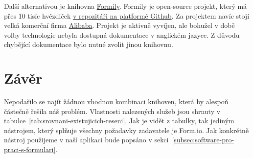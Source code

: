 Další alternativou je knihovna \href{https://formilyjs.org/}{Formily}.
Formily je open-source projekt, který má přes 10 tisíc hvězdiček \href{https://github.com/alibaba/formily}{v repozitáři na platformě Github}.
Za projektem navíc stojí velká komerční firma \href{https://www.alibaba.com/}{Alibaba}.
Projekt je aktivně vyvíjen, ale bohužel v době volby technologie nebyla dostupná dokumentace v anglickém jazyce.
Z důvodu chybějící dokumentace bylo nutné zvolit jinou knihovnu.

\section*{Závěr}\label{sec:zaver-analyzy-existujicich-reseni}

Nepodařilo se najít žádnou vhodnou kombinaci knihoven, která by alespoň částečně řešila náš problém.
Vlastnosti nalezených služeb jsou shrnuty v tabulce~\ref{tab:srovnani-existujicich-reseni}.
Jak je vidět z tabulky, tak jediným nástrojem, který splňuje všechny požadavky zadavatele je Form.io.
Jak konkrétně nástroj použijeme v naší aplikaci bude popsáno v sekci~\ref{subsec:software-pro-praci-s-formulari}.

\newcommand{\yes}{\tikzcmark\ Ano}
\newcommand{\no}{\tikzxmark\ Ne}
\renewcommand\tabularxcolumn[1]{m{#1}} %

